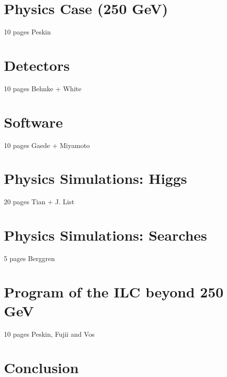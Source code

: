 \documentclass[%
 reprint,
 amsmath,amssymb,
 aps,
]{revtex4-1}
\begin{document}

   
   
\section{\label{sec:physics}Physics Case (250 GeV) }

10 pages Peskin
 

 
\section{\label{sec:detectors}Detectors }


  10 pages Behnke + White
  


\section{\label{sec:software}Software}

   10 pages Gaede + Miyamoto
   
   

\section{\label{sec:higgs}Physics Simulations: Higgs }


  20 pages Tian + J. List
  
  

\section{\label{sec:searches}Physics Simulations: Searches }


  5 pages Berggren
  
  

\section{\label{sec:ILC-HE}Program of the ILC beyond 250 GeV }
  10 pages Peskin, Fujii and Vos \\
  


\section{\label{sec:conclusion}Conclusion}




%

\end{document}
